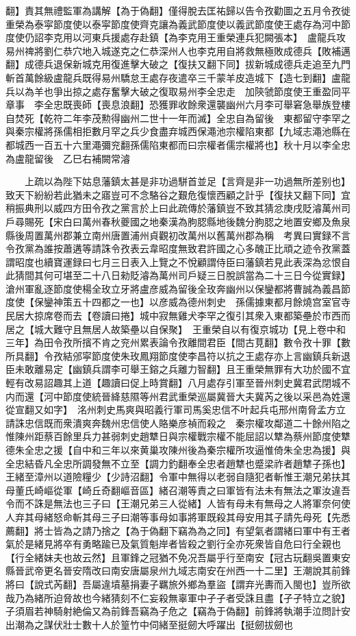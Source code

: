 翻】責其無禮監軍為講解【為于偽翻】僅得脫去匡祐歸以告令孜勸圖之五月令孜徙重榮為泰寜節度使以泰寜節度使齊克讓為義武節度使以義武節度使王處存為河中節度使仍詔李克用以河東兵援處存赴鎮【為李克用王重榮連兵犯闕張本】　盧龍兵攻易州禆將劉仁恭穴地入城遂克之仁恭深州人也李克用自將救無極敗成德兵【敗補邁翻】成德兵退保新城克用復進擊大破之【復扶又翻下同】拔新城成德兵走追至九門斬首萬餘級盧龍兵既得易州驕怠王處存夜遣卒三千蒙羊皮造城下【造七到翻】盧龍兵以為羊也爭出掠之處存奮擊大破之復取易州李全忠走　加陝虢節度使王重盈同平章事　李全忠既喪師【喪息浪翻】恐獲罪收餘衆還襲幽州六月李可舉窘急舉族登樓自焚死【乾符二年李茂勲得幽州二世十一年而滅】全忠自為留後　東都留守李罕之與秦宗權將孫儒相拒數月罕之兵少食盡弃城西保澠池宗權陷東都【九域志澠池縣在都城西一百五十六里澠彌兖翻孫儒陷東都而曰宗權者儒宗權將也】秋十月以李全忠為盧龍留後　乙巳右補闕常濬

　　上疏以為陛下姑息藩鎮太甚是非功過駢首並足【言齊是非一功過無所差别也】致天下紛紛若此猶未之寤豈可不念駱谷之艱危復懷西顧之計乎【復扶又翻下同】宜稍振典刑以威四方田令孜之黨言於上曰此疏傳於藩鎮豈不致其猜忿庚戌貶濬萬州司戶尋賜死【宋白曰萬州春秋夔國之地秦漢為朐䏰縣地後魏分朐䏰之地置安鄉及魚泉縣後周置萬州郡兼立南州唐置浦州貞觀初改萬州以舊萬州郡為稱　考異曰實録不言令孜黨為誰按蕭遘等請誅令孜表云韋昭度無致君許國之心多醜正比頑之迹令孜黨蓋謂昭度也續寶運録曰七月三日表入上覽之不悅顧謂侍臣曰藩鎮若見此表深為忿恨自此猜間其何可堪至二十八日勑貶濬為萬州司戶疑三日脫誤當為二十三日今從實録】　滄州軍亂逐節度使楊全玫立牙將盧彦威為留後全玫奔幽州以保鑾都將曹誠為義昌節度使【保鑾神策五十四都之一也】以彦威為德州刺史　孫儒據東都月餘燒宫室官寺民居大掠席卷而去【卷讀曰捲】城中寂無雞犬李罕之復引其衆入東都築壘於市西而居之【城大難守且無居人故築壘以自保聚】　王重榮自以有復京城功【見上卷中和三年】為田令孜所擯不肯之兖州累表論令孜離間君臣【間古莧翻】數令孜十罪【數所具翻】令孜結邠寜節度使朱玫鳳翔節度使李昌符以抗之王處存亦上言幽鎮兵新退臣未敢離易定【幽鎮兵謂李可舉王鎔之兵離力智翻】且王重榮無罪有大功於國不宜輕有改易詔趣其上道【趣讀曰促上時賞翻】八月處存引軍至晉州刺史冀君武閉城不内而還【河中節度使統晉絳慈隰等州君武重榮巡屬冀晉大夫冀芮之後以采邑為姓還從宣翻又如字】　洺州刺史馬爽與昭義行軍司馬奚忠信不叶起兵屯邢州南脅孟方立請誅忠信既而衆潰爽奔魏州忠信使人賂樂彦禎而殺之　秦宗權攻鄰道二十餘州陷之惟陳州距蔡百餘里兵力甚弱刺史趙犨日與宗權戰宗權不能屈詔以犨為蔡州節度使犨德朱全忠之援【自中和三年以來黄巢攻陳州後為秦宗權所攻逼惟倚朱全忠為援】與全忠結昏凡全忠所調發無不立至【調力釣翻奉全忠者趙犨也蹙梁祚者趙犨子孫也】　王緒至漳州以道險糧少【少詩沼翻】令軍中無得以老弱自隨犯者斬惟王潮兄弟扶其母董氏崎嶇從軍【崎丘奇翻嶇音區】緒召潮等責之曰軍皆有法未有無法之軍汝違吾令而不誅是無法也三子曰【王潮兄弟三人從緒】人皆有母未有無母之人將軍奈何使人弃其母緒怒命斬其母三子曰潮等事母如事將軍既殺其母安用其子請先母死【先悉薦翻】將士皆為之請乃捨之【為于偽翻下竊為為之同】有望氣者謂緒曰軍中有王者氣於是緒見將卒有勇略踰已及氣質魁岸者皆殺之劉行全亦死衆皆自危曰行全親也【行全緒妹夫也故云然】且軍鋒之冠猶不免况吾屬乎行至南安【冠古玩翻吳置東安縣晉武帝更名晉安隋改曰南安唐屬泉州九域志南安在州西一十二里】王潮說其前鋒將曰【說式芮翻】吾屬違墳墓捐妻子羈旅外鄉為羣盜【謂弃光夀而入閩也】豈所欲哉乃為緒所迫脅故也今緒猜刻不仁妄殺無辜軍中孑孑者受誅且盡【孑孑特立之貌】子須眉若神騎射絶倫又為前鋒吾竊為子危之【竊為于偽翻】前鋒將執潮手泣問計安出潮為之謀伏壯士數十人於篁竹中伺緒至挺劒大呼躍出【挺劒拔劒也